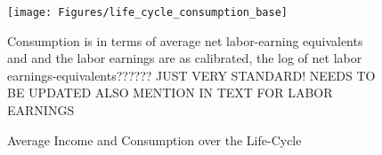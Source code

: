 \documentclass[a4paper,12pt,legno]{article}
\begin{document}
\begin{figure}[!htbp]
\caption{Average Income and Consumption over the Life-Cycle} 
\label{consumption_life_cycle}	%
\centering
\texttt{[image: Figures/life\_cycle\_consumption\_base]}  %

\begin{minipage}{0.8\linewidth}
\footnotesize{Consumption is in terms of average net labor-earning equivalents and and the labor earnings are as calibrated, the log of net labor earnings-equivalents?????? JUST VERY STANDARD! NEEDS TO BE UPDATED ALSO MENTION IN TEXT FOR LABOR EARNINGS}
\end{minipage}

\end{figure}
\end{document}
